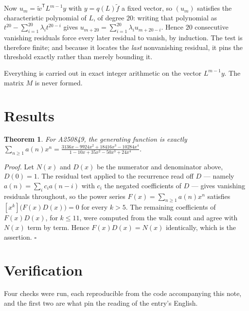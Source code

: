 \documentclass[11pt]{article}
\newtheorem{theorem}{Theorem}
\theoremstyle{definition}
\begin{document}
Now $u_m = \tilde w^{\mathsf T} L^{m-1} y$ with $y = q(L)\tilde f$ a fixed vector, so $(u_m)$ satisfies the characteristic polynomial of $L$, of degree $20$: writing that polynomial as $t^{20} - \sum_{i=1}^{20} \lambda_i t^{20-i}$ gives $u_{m+20} = \sum_{i=1}^{20} \lambda_i u_{m+20-i}$. Hence $20$ consecutive vanishing residuals force every later residual to vanish, by induction. The test is therefore finite; and because it locates the {\itshape last} nonvanishing residual, it pins the threshold exactly rather than merely bounding it.

Everything is carried out in exact integer arithmetic on the vector $L^{m-1}y$. The matrix $M$ is never formed.

\section{Results}

\begin{theorem} For A250849, the generating function is exactly $\sum_{n\ge 1} a(n)x^n = \frac{3136x - 9924x^{2} + 18416x^{3} - 10284x^{4}}{1 - 10x + 35x^{2} - 50x^{3} + 24x^{4}}$.\end{theorem}

{\itshape Proof.} Let $N(x)$ and $D(x)$ be the numerator and denominator above, $D(0)=1$. The residual test applied to the recurrence read off $D$ --- namely $a(n) = \sum_i c_i a(n-i)$ with $c_i$ the negated coefficients of $D$ --- gives vanishing residuals throughout, so the power series $F(x)=\sum_{n\ge 1}a(n)x^n$ satisfies $[x^k]\bigl(F(x)D(x)\bigr) = 0$ for every $k > 5$. The remaining coefficients of $F(x)D(x)$, for $k \le 11$, were computed from the walk count and agree with $N(x)$ term by term. Hence $F(x)D(x) = N(x)$ identically, which is the assertion. $\square$

\section{Verification}

Four checks were run, each reproducible from the code accompanying this note, and the first two are what pin the reading of the entry's English.
\end{document}
